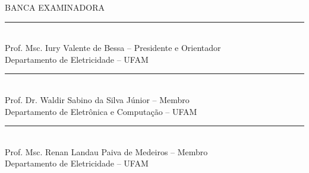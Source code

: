 \thispagestyle{empty}

\begin{center}

\autor


\vfill	\titulo


\vfill{
\begin{flushright}
	\begin{minipage}{8cm} 
		\apresentacao
	\end{minipage}
\end{flushright}
}

\vfill	{}


\vfill	BANCA EXAMINADORA

\vfill{
	\rule{300pt}{0.5pt} \\
	Prof. Msc. Iury Valente de Bessa -- Presidente e Orientador\\
	Departamento de Eletricidade -- UFAM
}

\vfill{
	\rule{300pt}{0.5pt} \\
	Prof. Dr. Waldir Sabino da Silva Júnior -- Membro \\
	Departamento de Eletrônica e Computação -- UFAM
}

\vfill{
	\rule{300pt}{0.5pt} \\
	Prof. Msc. Renan Landau Paiva de Medeiros -- Membro\\
	Departamento de Eletricidade -- UFAM
}


\vfill \local

\end{center}
